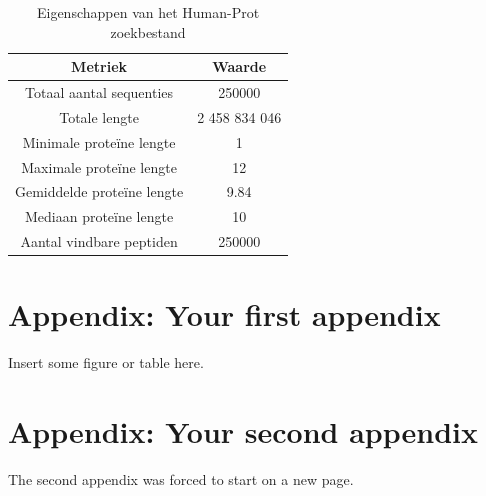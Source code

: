 \documentclass[11pt,dutch,faculty=we,layout=titlefont,underline=false,titleUppercase=true,titleUnderline=true]{ugent2016-report}
\begin{document}
    \begin{table}[h!]
        \centering
        \begin{tabular}{ c c }
            Metriek                    & Waarde        \\
            \hline\hline
            Totaal aantal sequenties   & 250000        \\
            Totale lengte              & 2 458 834 046 \\
            Minimale proteïne lengte   & 1             \\
            Maximale proteïne lengte & 12
            \\
            Gemiddelde proteïne lengte & 9.84          \\
            Mediaan proteïne lengte    & 10            \\
            Aantal vindbare peptiden   & 250000        \\
            \hline
        \end{tabular}
        \caption{Eigenschappen van het Human-Prot zoekbestand}
        \label{tab:humanprot_zoekbestand}
    \end{table}

    


    \printbibliography[heading=bibintoc,title={Referenties}] %


    \appendix


    \section{Appendix: Your first appendix}
    Insert some figure or table here.

    \newpage


    \section{Appendix: Your second appendix}
    The second appendix was forced to start on a new page.
\end{document}
